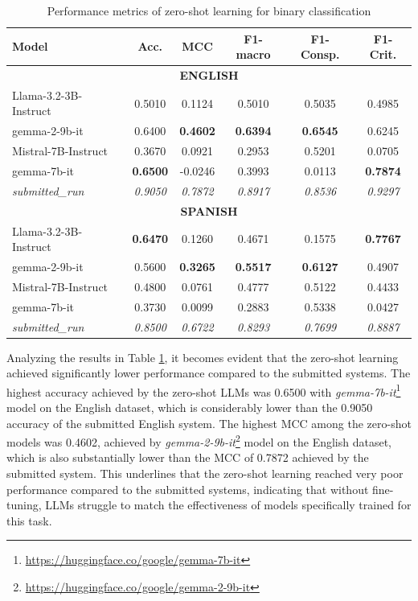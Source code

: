 \documentclass{Configuration_Files/PoliMi3i_thesis}
\begin{document}
\begin{table}[h]
    \centering
    \begin{tabular}{lccccc}
        \hline
        \textbf{Model} & \textbf{Acc.} & \textbf{MCC} & \textbf{F1-macro} & \textbf{F1-Consp.} & \textbf{F1-Crit.}   \\
        \hline
        \multicolumn{6}{c}{\textbf{ENGLISH}} \\
        \hline
        Llama-3.2-3B-Instruct & 0.5010 & 0.1124 & 0.5010 & 0.5035  & 0.4985  \\
        gemma-2-9b-it & 0.6400 & \textbf{0.4602} & \textbf{0.6394} & \textbf{0.6545} & 0.6245   \\
        Mistral-7B-Instruct & 0.3670 & 0.0921 & 0.2953 & 0.5201 & 0.0705   \\
        gemma-7b-it & \textbf{0.6500} & -0.0246 & 0.3993 & 0.0113 & \textbf{0.7874}  \\
        \hline
        \textit{submitted\_run} & \textit{0.9050} & \textit{0.7872} & \textit{0.8917} & \textit{0.8536} & \textit{0.9297}   \\
        \hline
        \hline
        \multicolumn{6}{c}{\textbf{SPANISH}} \\
        \hline
        Llama-3.2-3B-Instruct & \textbf{0.6470} & 0.1260 & 0.4671 & 0.1575  & \textbf{0.7767}  \\
        gemma-2-9b-it & 0.5600 & \textbf{0.3265} & \textbf{0.5517} & \textbf{0.6127} & 0.4907   \\
        Mistral-7B-Instruct & 0.4800 & 0.0761 & 0.4777 & 0.5122 & 0.4433   \\
        gemma-7b-it & 0.3730 & 0.0099 & 0.2883 & 0.5338 & 0.0427   \\
        \hline
        \textit{submitted\_run} & \textit{0.8500} & \textit{0.6722}  & \textit{0.8293} & \textit{0.7699} & \textit{0.8887}   \\
        \hline
    \end{tabular}
    \caption{Performance metrics of zero-shot learning for binary classification}
    \label{tab:performance_llms_T1_zero_shots}
\end{table}
\FloatBarrier


Analyzing the results in Table \ref{tab:performance_llms_T1_zero_shots}, it becomes evident that the zero-shot learning achieved significantly lower performance compared to the submitted systems. The highest accuracy achieved by the zero-shot LLMs was 0.6500 with \textit{gemma-7b-it}\footnote{\url{https://huggingface.co/google/gemma-7b-it}} model on the English dataset, which is considerably lower than the 0.9050 accuracy of the submitted English system. The highest MCC among the zero-shot models was 0.4602, achieved by \textit{gemma-2-9b-it}\footnote{\url{https://huggingface.co/google/gemma-2-9b-it}} model on the English dataset, which is also substantially lower than the MCC of 0.7872 achieved by the submitted system. This underlines that the zero-shot learning reached very poor performance compared to the submitted systems, indicating that without fine-tuning, LLMs struggle to match the effectiveness of models specifically trained for this task.
\end{document}
